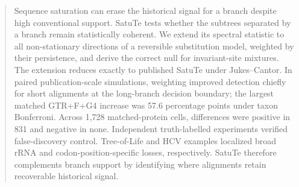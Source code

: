 \begin{abstract}
Sequence saturation can erase the historical signal for a branch despite high conventional support. SatuTe tests whether the subtrees separated by a branch remain statistically coherent. We extend its spectral statistic to all non-stationary directions of a reversible substitution model, weighted by their persistence, and derive the correct null for invariant-site mixtures. The extension reduces exactly to published SatuTe under Jukes--Cantor. In paired publication-scale simulations, weighting improved detection chiefly for short alignments at the long-branch decision boundary; the largest matched GTR+F+G4 increase was 57.6 percentage points under taxon Bonferroni. Across 1,728 matched-protein cells, differences were positive in 831 and negative in none. Independent truth-labelled experiments verified false-discovery control. Tree-of-Life and HCV examples localized broad rRNA and codon-position-specific losses, respectively. SatuTe therefore complements branch support by identifying where alignments retain recoverable historical signal.
\end{abstract}
